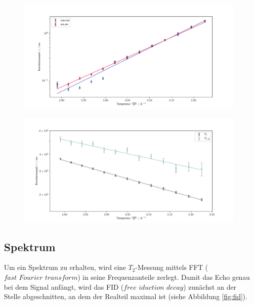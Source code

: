 \begin{figure}[H]
    \centering
    \includegraphics[width=\textwidth]{Auswertung/Tempabh/Korr_Temp.pdf}
    \caption{}
    \label{fig:korrtemp}
\end{figure}


\begin{figure}[H]
    \centering
    \includegraphics[width=\textwidth]{Auswertung/Tempabh/T1.pdf}
    \caption{}
    \label{fig:t1t1q}
\end{figure}

\subsection{Spektrum}
\label{sec:spektr}
Um ein Spektrum zu erhalten, wird eine $T_2$-Messung mittels FFT
($\textit{fast Fourier transform}$) in seine Frequenzanteile zerlegt.
Damit das Echo genau bei dem Signal anfängt, wird das FID
($\textit{free iduction decay}$) zunächst an der Stelle abgeschnitten, an dem der
Realteil maximal ist (siehe Abbildung \ref{fig:fid}).

